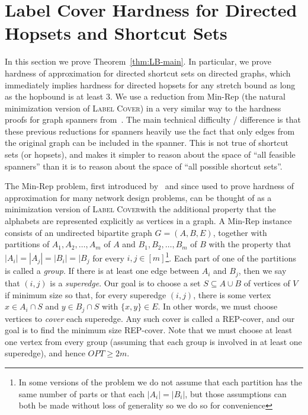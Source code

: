 \documentclass{article}
\theoremstyle{definition}
\theoremstyle{remark}
\newcommand{\LabelCover}{\textsc{Label Cover}}
\begin{document}
 


\iflong
\section{Label Cover Hardness for Directed Hopsets and Shortcut Sets} \label{app:hardness}
In this section we prove Theorem~\ref{thm:LB-main}. 
 In particular, we prove hardness of approximation for directed shortcut sets on directed graphs, which immediately implies hardness for directed hopsets for any stretch bound as long as the hopbound is at least $3$.  We use a reduction from Min-Rep (the natural minimization version of \LabelCover) in a very similar way to the hardness proofs for graph spanners from~\cite{Kor01,EP07,DKR16,CD16}.  The main technical difficulty / difference is that these previous reductions for spanners heavily use the fact that only edges from the original graph can be included in the spanner.  This is not true of shortcut sets (or hopsets), and makes it simpler to reason about the space of ``all feasible spanners'' than it is to reason about the space of ``all possible shortcut sets''.  

The Min-Rep problem, first introduced by~\cite{Kor01} and since used to prove hardness of approximation for many network design problems, can be thought of as a minimization version of \LabelCover with the additional property that the alphabets are represented explicitly as vertices in a graph.  A Min-Rep instance consists of an undirected bipartite graph $G = (A, B, E)$, together with partitions of $A_1, A_2, \dots, A_{m}$ of $A$ and $B_1, B_2, \dots, B_m$ of $B$ with the property that $|A_i| = |A_j| = |B_i| = |B_j$ for every $i,j \in [m]$\footnote{In some versions of the problem we do not assume that each partition has the same number of parts or that each $|A_i|=|B_i|$, but those assumptions can both be made without loss of generality so we do so for convenience}.  Each part of one of the partitions is called a \emph{group}.  If there is at least one edge between $A_i$ and $B_j$, then we say that $(i,j)$ is a \emph{superedge}.  Our goal is to choose a set $S \subseteq A \cup B$ of vertices of $V$ if minimum size so that, for every superedge $(i,j)$, there is some vertex $x \in A_i \cap S$ and $y \in B_j \cap S$ with $\{x,y\} \in E$.  In other words, we must choose vertices to \emph{cover} each superedge.  Any such cover is called a REP-cover, and our goal is to find the minimum size REP-cover.  Note that we must choose at least one vertex from every group (assuming that each group is involved in at least one superedge), and hence $OPT \geq 2m$.  
\end{document}
